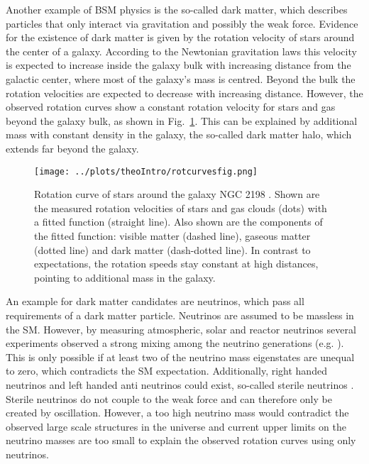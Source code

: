 \noindent Another example of BSM physics is the so-called dark matter, which describes particles that only interact via gravitation and possibly the weak force. Evidence for the existence of dark matter is given by the rotation velocity of stars around the center of a galaxy. According to the Newtonian gravitation laws this velocity is expected to increase inside the galaxy bulk with increasing distance from the galactic center, where most of the galaxy's mass is centred. Beyond the bulk the rotation velocities are expected to decrease with increasing distance. However, the observed rotation curves show a constant rotation velocity for stars and gas beyond the galaxy bulk, as shown in Fig.~\ref{fig:theo:rotcurves}. This can be explained by additional mass with constant density in the galaxy, the so-called dark matter halo, which extends far beyond the galaxy.\\ 
 
\begin{figure}
	\centering
	\texttt{[image: ../plots/theoIntro/rotcurvesfig.png]}
	\caption[Rotation curve of stars around the galaxy NGC 2198]{Rotation curve of stars around the galaxy NGC 2198 \cite{rotcurves}. Shown are the measured rotation velocities of stars and gas clouds (dots) with a fitted function (straight line). Also shown are the components of the fitted function: visible matter (dashed line), gaseous matter (dotted line) and dark matter (dash-dotted line). In contrast to expectations, the rotation speeds stay constant at high distances, pointing to additional mass in the galaxy.}
	\label{fig:theo:rotcurves}
\end{figure}

\noindent An example for dark matter candidates are neutrinos, which pass all requirements of a dark matter particle. Neutrinos are assumed to be massless in the SM. However, by measuring atmospheric, solar and reactor neutrinos several experiments observed a strong mixing among the neutrino generations (e.g. \cite{nuoszi1,nuoszi2,nuoszi3,nuoszi4}). This is only possible if at least two of the neutrino mass eigenstates are unequal to zero, which contradicts the SM expectation. Additionally, right handed neutrinos and left handed anti neutrinos could exist, so-called sterile neutrinos \cite{sterilenu}. Sterile neutrinos do not couple to the weak force and can therefore only be created by oscillation. However, a too high neutrino mass would contradict the observed large scale structures in the universe and current upper limits on the neutrino masses are too small \cite{numasses1,numasses2} to explain the observed rotation curves using only neutrinos.\\

